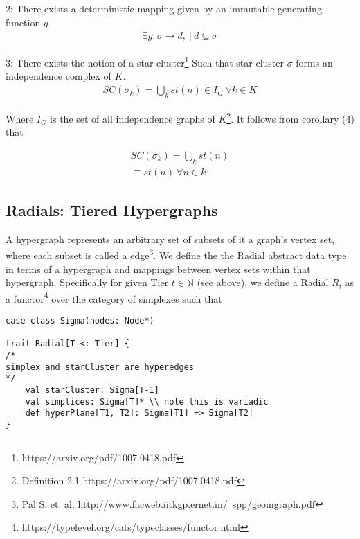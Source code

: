 \documentclass{article}
\begin{document}
2: There exists a deterministic mapping given by an immutable generating function $g$
\begin{equation} \label{eq1}
\begin{split}
\exists g: \sigma \rightarrow d, \ | \ d \subseteq \sigma
\end{split}
\end{equation}

3: There exists the notion of a star cluster\footnote{https://arxiv.org/pdf/1007.0418.pdf} Such that star cluster $\sigma$ forms an independence complex of $K$.
\begin{equation} \label{eq1}
\begin{split}
SC(\sigma_k) = \bigcup_k st(n) \in I_G \ \forall k \in K
\end{split}
\end{equation}

Where $I_G$ is the set of all independence graphs of $K$\footnote{Definition 2.1 https://arxiv.org/pdf/1007.0418.pdf}. It follows from corollary (4) that

\begin{equation} \label{eq1}
\begin{split}
SC(\sigma_k) = \bigcup_k st(n) \\
\equiv st(n) \ \forall n \in k
\end{split}
\end{equation}

\subsection{Radials: Tiered Hypergraphs}
A hypergraph represents an arbitrary set of subsets of it a graph's vertex set, where each subset is called a edge\footnote{Pal S. et. al. http://www.facweb.iitkgp.ernet.in/~spp/geomgraph.pdf}. We define the the Radial abstract data type in terms of a hypergraph and mappings between vertex sets within that hypergraph. Specifically for given Tier $t \in \mathbb{N}$ (see above), we define a Radial $R_t$ as a functor\footnote{https://typelevel.org/cats/typeclasses/functor.html} over the category of simplexes such that

\begin{lstlisting}
case class Sigma(nodes: Node*)

trait Radial[T <: Tier] {
/*
simplex and starCluster are hyperedges
*/
	val starCluster: Sigma[T-1]
	val simplices: Sigma[T]* \\ note this is variadic
	def hyperPlane[T1, T2]: Sigma[T1] => Sigma[T2]
}
\end{lstlisting}
\end{document}
